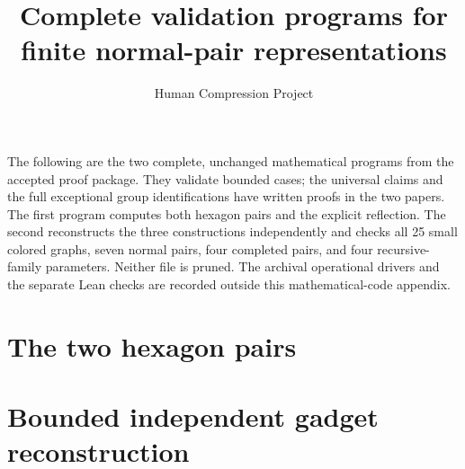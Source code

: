
\title{Complete validation programs for finite normal-pair representations}
\author{Human Compression Project}
\date{}

\maketitle
The following are the two complete, unchanged mathematical programs from the
accepted proof package. They validate bounded cases; the universal claims and
the full exceptional group identifications have written proofs in the two
papers. The first program computes both hexagon pairs and the explicit
reflection. The second reconstructs the three constructions independently and
checks all 25 small colored graphs, seven normal pairs, four completed pairs,
and four recursive-family parameters. Neither file is pruned. The archival
operational drivers and the separate Lean checks are recorded outside this
mathematical-code appendix.

\section*{The two hexagon pairs}
\section*{Bounded independent gadget reconstruction}

